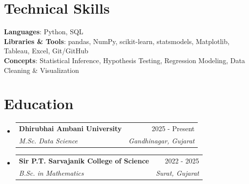 \documentclass[letterpaper,11pt]{article}
\makeatletter
\newcommand{\resumeSubheading}[4]{
  \vspace{-2pt}\item
    \begin{tabularx}{\textwidth}[t]{@{}Xr@{}}
      \textbf{#1} & #2 \\
      \textit{\small#3} & \textit{\small #4} \\
    \end{tabularx}\vspace{-7pt}
}
\newcommand{\resumeSubHeadingListStart}{\begin{itemize}[leftmargin=0in, label={}]}
\newcommand{\resumeSubHeadingListEnd}{\end{itemize}}
\makeatother
\begin{document}
\section{Technical Skills}
 \begin{itemize}[leftmargin=0in, label={}]
    \small{\item{
     \textbf{Languages}{: Python, SQL} \\
     \textbf{Libraries \& Tools}{: pandas, NumPy, scikit-learn, statsmodels, Matplotlib, Tableau, Excel, Git/GitHub} \\
     \textbf{Concepts}{: Statistical Inference, Hypothesis Testing, Regression Modeling, Data Cleaning \& Visualization}
    }}
 \end{itemize}

\section{Education}
  \resumeSubHeadingListStart
    \resumeSubheading
      {Dhirubhai Ambani University}{2025 - Present}
      {M.Sc. Data Science}{Gandhinagar, Gujarat}
    \resumeSubheading
      {Sir P.T. Sarvajanik College of Science}{2022 - 2025}
      {B.Sc. in Mathematics}{Surat, Gujarat}
  \resumeSubHeadingListEnd

\end{document}
